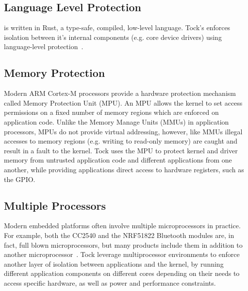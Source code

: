 \subsection{Language Level Protection}

\name is written in Rust, a type-safe, compiled, low-level language. Tock's
enforces isolation between it's internal components (e.g. core device drivers)
using language-level protection~.

\subsection{Memory Protection}

Modern ARM Cortex-M processors provide a hardware protection mechanism called
Memory Protection Unit (MPU).  An MPU allows the kernel to set access
permissions on a fixed number of memory regions which are enforced on
application code. Unlike the Memory Manage Units (MMUs) in application
processors, MPUs do not provide virtual addressing, however, like MMUs illegal
accesses to memory regions (e.g. writing to read-only memory) are caught and
result in a fault to the kernel. Tock uses the MPU to protect kernel and driver
memory from untrusted application code and different applications from one
another, while providing applications direct access to hardware registers, such
as the GPIO.

\subsection{Multiple Processors}

Modern embedded platforms often involve multiple microprocessors in practice.
For example, both the CC2540 and the NRF51822 Bluetooth modules are, in fact,
full blown microprocessors, but many products include them in addition to
another microprocessor~. Tock leverage
multiprocessor environments to enforce another layer of isolation between
applications and the kernel, by running different application components on
different cores depending on their needs to access specific hardware, as well as
power and performance constraints.

